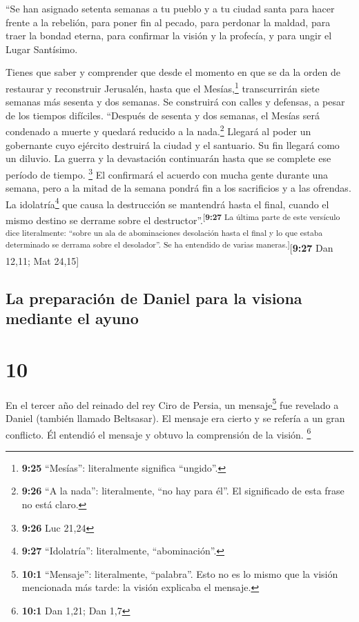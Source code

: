  ``Se han asignado setenta semanas a tu pueblo y a tu
ciudad santa para hacer frente a la rebelión, para poner fin al pecado,
para perdonar la maldad, para traer la bondad eterna, para confirmar la
visión y la profecía, y para ungir el Lugar Santísimo.

 Tienes que saber y comprender que desde el momento en
que se da la orden de restaurar y reconstruir Jerusalén, hasta que el
Mesías,\footnote{\textbf{9:25} ``Mesías'': literalmente significa
  ``ungido''.} transcurrirán siete semanas más sesenta y dos semanas. Se
construirá con calles y defensas, a pesar de los tiempos difíciles.
 ``Después de sesenta y dos semanas, el Mesías será
condenado a muerte y quedará reducido a la nada.\footnote{\textbf{9:26}
  ``A la nada'': literalmente, ``no hay para él''. El significado de
  esta frase no está claro.} Llegará al poder un gobernante cuyo
ejército destruirá la ciudad y el santuario. Su fin llegará como un
diluvio. La guerra y la devastación continuarán hasta que se complete
ese período de tiempo. \footnote{\textbf{9:26} Luc 21,24}
 El confirmará el acuerdo con mucha gente durante una
semana, pero a la mitad de la semana pondrá fin a los sacrificios y a
las ofrendas. La idolatría\footnote{\textbf{9:27} ``Idolatría'':
  literalmente, ``abominación''.} que causa la destrucción se mantendrá
hasta el final, cuando el mismo destino se derrame sobre el
destructor''.\textsuperscript{{[}\textbf{9:27} La última parte de este
versículo dice literalmente: ``sobre un ala de abominaciones desolación
hasta el final y lo que estaba determinado se derrama sobre el
desolador''. Se ha entendido de varias maneras.{]}}{[}\textbf{9:27} Dan
12,11; Mat 24,15{]}

\hypertarget{la-preparaciuxf3n-de-daniel-para-la-visiona-mediante-el-ayuno}{%
\subsection{La preparación de Daniel para la visiona mediante el
ayuno}\label{la-preparaciuxf3n-de-daniel-para-la-visiona-mediante-el-ayuno}}

\hypertarget{section-9}{%
\section{10}\label{section-9}}

 En el tercer año del reinado del rey Ciro de Persia, un
mensaje\footnote{\textbf{10:1} ``Mensaje'': literalmente, ``palabra''.
  Esto no es lo mismo que la visión mencionada más tarde: la visión
  explicaba el mensaje.} fue revelado a Daniel (también llamado
Beltsasar). El mensaje era cierto y se refería a un gran conflicto. Él
entendió el mensaje y obtuvo la comprensión de la visión. \footnote{\textbf{10:1}
  Dan 1,21; Dan 1,7}

